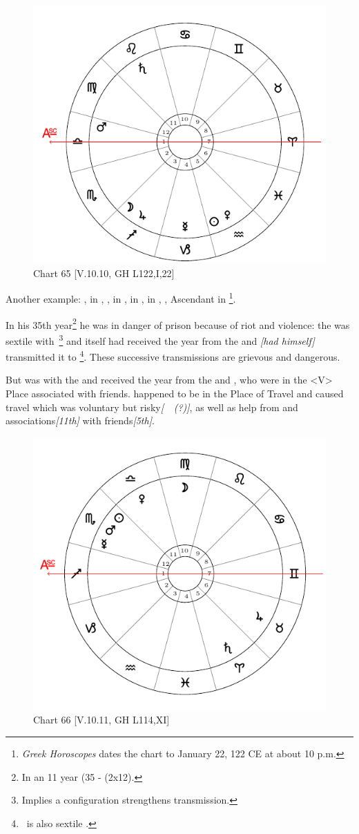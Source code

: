 \begin{figure}
\centering
\includegraphics[width=.68\textwidth]{charts/5_10_10}
\caption{Chart 65 [V.10.10, GH L122,I,22]}
\label{fig:chart65}
\end{figure}

\newpage
\noindent Another example: \Sun, \Venus\xspace in \Aquarius, \Moon, \Jupiter\xspace in \Sagittarius, \Saturn\xspace in \Leo, \Mercury\xspace in \Capricorn, \Mars, Ascendant in \Libra\footnote{\textit{Greek Horoscopes} dates the chart to January 22, 122 CE at about 10 p.m.}. 

In his 35th year\footnote{In an 11 year (35 - (2x12).} he was in danger of prison because of riot and
violence: the \Moon\xspace was sextile with \Mars\,\footnote{Implies a configuration strengthens transmission.} and \Mars\xspace itself had received the year from the \Moon\xspace and \textsl{[\Mars had himself]} transmitted it to \Saturn\footnote{\Mars\, is also sextile \Saturn.}. These successive transmissions are grievous and dangerous. 

But \Jupiter\xspace was with the \Moon\xspace and received the year from the \Sun\xspace and \Venus, who were in the <V> Place associated with friends. \Jupiter\xspace happened to be in the Place of Travel and caused travel which was voluntary but risky\textsl{[\Sextile\, \Mars\, (?)]}, as well as help from and associations\textsl{[11th]} with friends\textsl{[5th]}.

\newpage
\begin{figure}
\centering
\includegraphics[width=.68\textwidth]{charts/5_10_11}
\caption{Chart 66 [V.10.11, GH L114,XI]}
\label{fig:chart66}
\end{figure}

